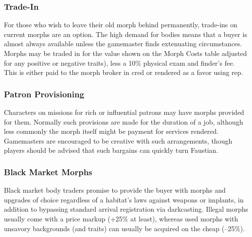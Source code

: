 \subsubsection{Trade-In}

For those who wish to leave their old morph behind 
permanently, trade-ins on current morphs are an 
option. The high demand for bodies means that a buyer 
is almost always available unless the gamemaster finds 
extenuating circumstances. Morphs may be traded in 
for the value shown on the Morph Costs table adjusted
for any positive or negative traits), less a 10\%
physical exam and finder's fee. This is either paid to the 
morph broker in cred or rendered as a favor using rep.

\subsubsection{Patron Provisioning}

Characters on missions for rich or influential patrons 
may have morphs provided for them. Normally 
such provisions are made for the duration of a job, 
although less commonly the morph itself might be 
payment for services rendered. Gamemasters are 
encouraged to be creative with such arrangements, 
though players should be advised that such bargains 
can quickly turn Faustian.

\subsubsection{Black Market Morphs}

Black market body traders promise to provide the 
buyer with morphs and upgrades of choice regardless 
of a habitat's laws against weapons or implants, in 
addition to bypassing standard arrival registration 
via darkcasting. Illegal morphs usually come with a 
price markup (+25\% at least), whereas used morphs 
with unsavory backgrounds (and traits) can usually be 
acquired on the cheap (–25\%).

